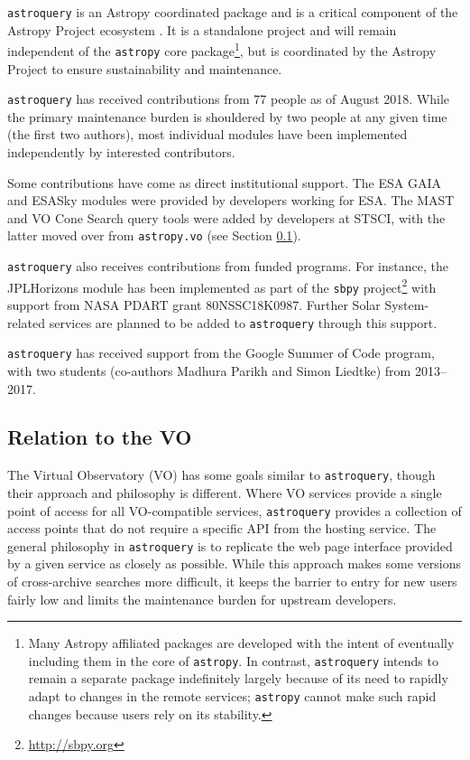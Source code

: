 \documentclass[twocolumn]{aastex62}
\newcommand{\package}[1]{\texttt{#1}\xspace}
\newcommand{\astroquery}{\package{astroquery}}
\newcommand{\astropy}{Astropy\xspace}
\newcommand{\astropypkg}{\package{astropy}}
\begin{document}
\astroquery is an \astropy coordinated package \citep{APE15} and is a critical
component of the \astropy Project ecosystem \citep{Astropy-Collaboration2013a}.
It is a standalone project and will remain independent of the \astropypkg core
package\footnote{Many \astropy affiliated packages are developed with the
intent of eventually including them in the core of \astropypkg.  In contrast,
\astroquery intends to remain a separate package indefinitely largely because
of its need to rapidly adapt to changes in the remote services; \astropypkg
cannot make such rapid changes because users rely on its stability.}, but is
coordinated by the \astropy Project to ensure sustainability and maintenance.

\astroquery has received contributions from 77 people as of August 2018.  While the primary maintenance
burden is shouldered by two people at any given time (the first two authors),
most individual modules have been implemented independently by interested
contributors.

Some contributions have come as direct institutional support.  The ESA GAIA and
ESASky modules were provided by developers working for ESA\@.  The
MAST and VO Cone Search query tools were added by developers at STSCI, with the
latter moved over from \texttt{astropy.vo} (see Section \ref{sec:vo}).

\astroquery also receives contributions from funded programs. For instance, the
JPLHorizons module has been implemented as part of the \texttt{sbpy}
project\footnote{\url{http://sbpy.org}} with support from NASA PDART grant
80NSSC18K0987. Further Solar System-related services are planned to be added to
\astroquery through this support.


\astroquery has received support from the Google Summer of Code
program, with two students (co-authors Madhura Parikh and Simon Liedtke)
from 2013--2017.



\subsection{Relation to the VO}
\label{sec:vo}

The Virtual Observatory (VO) has some goals similar to \astroquery,
though their approach and philosophy is different.  Where VO services provide a
single point of access for all VO-compatible services, \astroquery
provides a collection of access points that do not require a specific API from
the hosting service.  The general philosophy in \astroquery is to
replicate the web page interface provided by a given service as closely as
possible.  While this approach makes some versions of cross-archive searches
more difficult, it keeps the barrier to entry for new users fairly low and limits
the maintenance burden for upstream developers.
\end{document}
